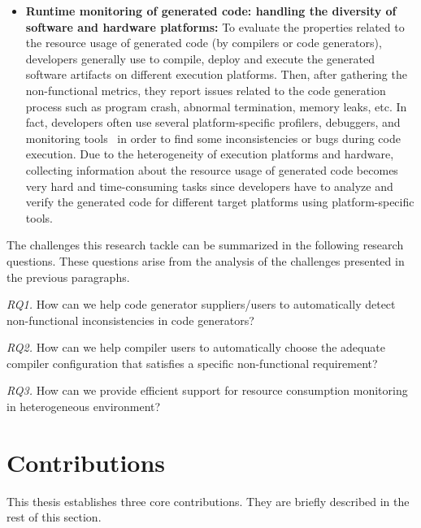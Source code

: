 \begin{itemize}
\item
\textbf{Runtime monitoring of generated code: handling the diversity of software and hardware platforms:} To evaluate the properties related to the resource usage of generated code (by compilers or code generators), developers generally use to compile, deploy and execute the generated software artifacts on different execution platforms. Then, after gathering the non-functional metrics, they report issues related to the code generation process such as program crash, abnormal termination, memory leaks, etc.
In fact, developers often use several platform-specific profilers, debuggers, and monitoring tools~\cite{guana2014chaintracker,delgado2004taxonomy} in order to find some inconsistencies or bugs during code execution. 
Due to the heterogeneity of execution platforms and hardware, collecting information about the resource usage of generated code becomes very hard and time-consuming tasks since developers have to analyze and verify the generated code for different target platforms using platform-specific tools. 


\end{itemize}
The challenges this research tackle can be summarized in the following research questions. These questions arise from the analysis of the challenges presented in the previous paragraphs.

\textit{RQ1.} How can we help code generator suppliers/users to automatically detect non-functional inconsistencies in code generators?

\textit{RQ2.} How can we help compiler users to automatically choose the adequate compiler configuration that satisfies a specific non-functional requirement?

\textit{RQ3.} How can we provide efficient support for resource consumption monitoring in heterogeneous environment?


\section{Contributions}
This thesis establishes three core contributions. They are briefly described in the rest of this section.

